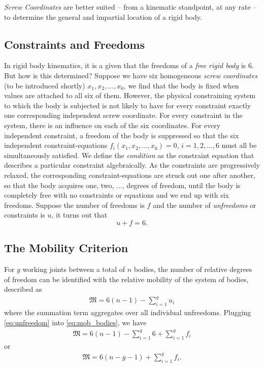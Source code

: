 \begin{tcolorbox}[title=Determining Degrees of Freedom]
	\textit{Screw Coordinates} are better suited -- from a kinematic standpoint, at any rate -- to determine the general and impartial location of a rigid body.
\end{tcolorbox}

\subsection{Constraints and Freedoms}
%
In rigid body kinematics, it is a given that the freedoms of a \textit{free rigid body} is $6$. But how is this determined? Suppose we have six homogeneous \textit{screw coordinates} (to be introduced shortly) $x_1, x_2, \ldots, x_6$, we find that the body is fixed when values are attached to all six of them. However, the physical constraining system to which the body is subjected is not likely to have for every constraint exactly one corresponding independent screw coordinate. For every constraint in the system, there is an influence on each of the six coordinates. For every independent constraint, a freedom of the body is suppressed so that the six independent constraint-equations $f_i(x_1, x_2, \ldots, x_6)=0, \, i = 1, 2, \ldots, 6$ must all be simultaneously satisfied. We define the \textit{condition} as the constraint equation that describes a particular constraint algebraically. As the constraints are progressively relaxed, the corresponding constraint-equations are struck out one after another, so that the body acquires one, two, $\ldots$, degrees of freedom, until the body is completely free with no constraints or equations and we end up with six freedoms. Suppose the number of freedoms is $f$ and the number of \textit{unfreedoms} or constraints is $u$, it turns out that 
%
\begin{equation}
	u + f = 6.
	\label{eq:unfreedom}
\end{equation}

\subsection{The Mobility Criterion}

For $g$ working joints between a total of $n$ bodies, the number of relative degrees of freedom can be identified with the relative mobility of the system of bodies, described as 
%
\begin{align}
	\mathfrak{M} = 6(n-1) - \sum_{i=1}^{g} u_i
	\label{eq:mob_bodies}
\end{align}
%
where the summation term aggregates over all individual unfreedoms. Plugging \eqref{eq:unfreedom} into  \eqref{eq:mob_bodies}, we have 
%
\begin{align}
\mathfrak{M} = 6(n-1) -\sum_{i=1}^g 6 + \sum_{i=1}^{g} f_i
\end{align}
%
or 
%
\begin{align}
\mathfrak{M} = 6(n - g - 1) + \sum_{i=1}^{g} f_i.
\label{eq:mob_cond_gen}
\end{align}

